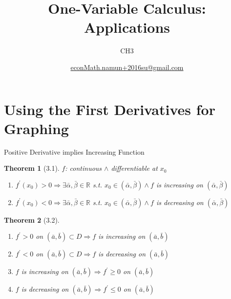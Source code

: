 \documentclass[final]{beamer}
\author[조남운]{\url{econMath.namun+2016su@gmail.com}}
\title{One-Variable Calculus: Applications}
\subtitle{CH3}
\newtheorem{thm}{Theorem}
\begin{document}
	\maketitle


\section{Using the First Derivatives for Graphing} %
\label{sec:using_the_first_derivative_for_graphing}

\begin{frame}[t]{Positive Derivative implies Increasing Function}
	\begin{thm}[3.1]
		$f$: continuous $\land$ differentiable at $x_0$
		\begin{enumerate}
			\item $f^\prime (x_0)>0 \Rightarrow \exists \bar\alpha,\bar\beta\in\mathbb{R} $ s.t. $x_0\in(\bar\alpha,\bar\beta)\land f$ is increasing on $(\bar\alpha,\bar\beta)$
			\item $f^\prime (x_0)<0 \Rightarrow \exists \bar\alpha,\bar\beta\in\mathbb{R} $ s.t. $x_0\in(\bar\alpha,\bar\beta)\land f$ is decreasing on $(\bar\alpha,\bar\beta)$
		\end{enumerate}
	\end{thm}
	\begin{thm}
		[3.2]
		\begin{enumerate}
			\item $f^\prime>0$ on $(\bar a, \bar b)\subset D \Rightarrow f$ is increasing on $(\bar a,\bar b)$
			\item $f^\prime<0$ on $(\bar a, \bar b)\subset D \Rightarrow f$ is decreasing on $(\bar a,\bar b)$
			\item $f$ is increasing on $(\bar a, \bar b) \Rightarrow f^\prime \ge 0$ on $(\bar a, \bar b)$
			\item $f$ is decreasing on $(\bar a, \bar b) \Rightarrow f^\prime \le 0$ on $(\bar a, \bar b)$
		\end{enumerate}
	\end{thm}
\end{frame}
\end{document}
